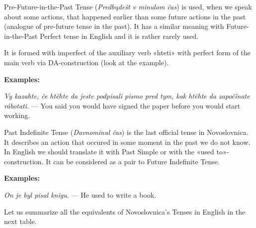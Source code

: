Pre-Future-in-the-Past Tense (\textit{Predbųdešt v minulom čas}) is used, when we speak about some actions, that happened earlier than some future actions in the past (analogue of pre-future tense in the past). It has a similar meaning with Future-in-the-Past Perfect tense in English and it is rather rarely used.

It is formed with imperfect of the auxiliary verb «hteti» with perfect form of the main verb via DA-construction (look at the example).

\textbf{Examples:}

\textit{Vy kazahte, če htěhte da jeste podpisali pismo pred tym, kak htěhte da započïnate råbotati.} — You said you would have signed the paper before you would start working.

Past Indefinite Tense (\textit{Davnominul čas}) is the last official tense in Novoslovnica. It describes an action that occured in some moment in the past we do not know. In English we should translate it with Past Simple or with the «used to»-construction. It can be considered as a pair to Future Indefinite Tense.

\textbf{Examples:}

\textit{On je byl pisal knigu.} — He used to write a book.

Let us summarize all the equivalents of Novoslovnica's Tenses in English in the next table.


